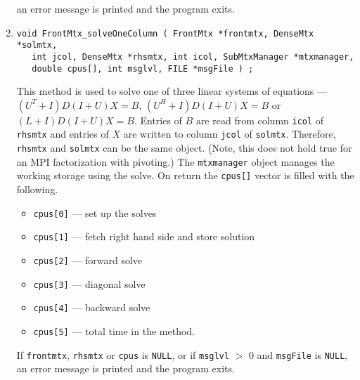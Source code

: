 \begin{enumerate}
an error message is printed and the program exits.
\item
\begin{verbatim}
void FrontMtx_solveOneColumn ( FrontMtx *frontmtx, DenseMtx *solmtx,
   int jcol, DenseMtx *rhsmtx, int icol, SubMtxManager *mtxmanager,
   double cpus[], int msglvl, FILE *msgFile ) ;
\end{verbatim}
\par
This method is used to solve one of three linear systems of equations
---
$(U^T + I)D(I + U) X = B$,
$(U^H + I)D(I + U) X = B$ or
$(L + I)D(I + U) X = B$.
Entries of $B$ are read from column {\tt icol} of {\tt rhsmtx} and
entries of $X$ are written to column {\tt jcol} of {\tt solmtx}.
Therefore, {\tt rhsmtx} and {\tt solmtx} can be the same object.
(Note, this does not hold true for an MPI factorization with pivoting.)
The {\tt mtxmanager} object manages the working storage using the solve.
On return the {\tt cpus[]} vector is filled with the following.
\begin{itemize}
\item
{\tt cpus[0]} --- set up the solves
\item
{\tt cpus[1]} --- fetch right hand side and store solution
\item
{\tt cpus[2]} --- forward solve
\item
{\tt cpus[3]} --- diagonal solve
\item
{\tt cpus[4]} --- backward solve
\item
{\tt cpus[5]} --- total time in the method.
\end{itemize}
\par {}
If {\tt frontmtx}, {\tt rhsmtx} or {\tt cpus}
is {\tt NULL},
or if {\tt msglvl} $>$ 0 and {\tt msgFile} is {\tt NULL},
an error message is printed and the program exits.
\end{enumerate}

%
%
